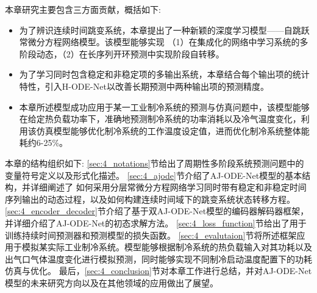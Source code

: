 本章研究主要包含三方面贡献，概括如下:
\begin{itemize}
    \item 为了辨识连续时间跳变系统，本章提出了一种新颖的深度学习模型——自跳跃常微分方程网络模型。该模型能够实现
    （1）在集成化的网络中学习系统的多阶段动态，（2）在长序列开环预测中实现阶段自转移。
    \item 为了学习同时包含稳定和非稳定项的多输出系统，本章结合每个输出项的统计特性，引入H-ODE-Net以改善长期预测中两种输出项的预测精度。
    \item 本章所述模型成功应用于某一工业制冷系统的预测与仿真问题中，该模型能够在给定热负载功率下，准确地预测制冷系统的功率消耗以及冷气温度变化，利用该仿真模型能够优化制冷系统的工作温度设定值，进而优化制冷系统整体能耗约6-25\%。
\end{itemize}

本章的结构组织如下:
\ref{sec:4_notations}节给出了周期性多阶段系统预测问题中的变量符号定义以及形式化描述。
\ref{sec:4_ajode}节介绍了AJ-ODE-Net模型的基本结构，并详细阐述了
如何采用分层常微分方程网络学习同时带有稳定和非稳定时间序列输出的动态过程，以及如何构建连续时间域下的跳变系统状态转移方程。
\ref{sec:4_encoder_decoder}节介绍了基于双AJ-ODE-Net模型的编码器解码器框架，并详细介绍了AJ-ODE-Net的初态求解方法。
\ref{sec:4_loss_function}节给出了用于训练持续时间预测器和预测模型的损失函数。
\ref{sec:4_evalutaion}节将所述框架应用于模拟某实际工业制冷系统。模型能够根据制冷系统的热负载输入对其功耗以及出气口气体温度变化进行模拟预测，同时能够实现不同制冷启动温度配置下的功耗仿真与优化。
最后，\ref{sec:4_conclusion}节对本章工作进行总结，并对AJ-ODE-Net模型的未来研究方向以及在其他领域的应用做出了展望。


